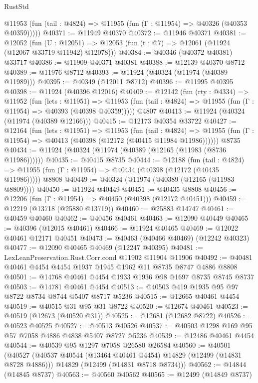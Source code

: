\begin{lexlean}{RustStd}
\begin{coremodule}
{\begin{coremodule}
{{{{{{{{{{{{{{{{{{{{{{{{{{{{{{{{{{{{{{{{{{{{{{{{{{{{{{{{{{{{{{{{{{{{{{{{{{{{{{{{      @11953 (fun (tail : @4824) => @11955 (fun (Γ : @11954) => @40326 (@40353 @40359)))))
@40371 := @11949 @40370
@40372 := @11946 @40371
@40381 := @12052
    (fun (U : @12051) => @12053 (fun (t : @7) => @12061 (@11924 (@12067 @33719 @11942) @12078)))
@40384 := @40346 (@40372 @40381) @33717
@40386 := @11909 @40371 @40381
@40388 := @12139 @40370 @8712
@40389 := @11976 @8712
@40393 := @11924 (@40324 (@11974 (@40389 @11989)))
@40395 := @40349 (@12011 @8712)
@40396 := @11995 @40395
@40398 := @11924 (@40396 @12016)
@40409 := @12142
    (fun (rty : @4334) =>
    @11952
      (fun (lets : @11951) =>
      @11953 (fun (tail : @4824) => @11955 (fun (Γ : @11954) => @40393 (@40398 @40359)))))
    @4807
@40413 := @11924 (@40324 (@11974 (@40389 @12166)))
@40415 := @12173 @40354 @33722
@40427 := @12164
    (fun (lets : @11951) =>
    @11953
      (fun (tail : @4824) =>
      @11955 (fun (Γ : @11954) => @40413 (@40398 (@12172 (@40415 @11984 @11986))))))
    @8735
@40434 := @11924 (@40324 (@11974 (@40389 (@12165 (@11983 (@8736 @11986))))))
@40435 := @40415 @8735
@40444 := @12188
    (fun (tail : @4824) => @11955 (fun (Γ : @11954) => @40434 (@40398 (@12172 (@40435 @11986)))))
    @8808
@40449 := @40324 (@11974 (@40389 (@12165 (@11983 @8809))))
@40450 := @11924 @40449
@40451 := @40435 @8808
@40456 := @12206 (fun (Γ : @11954) => @40450 (@40398 (@12172 @40451)))
@40459 := @12219 (@13718 (@25880 @13719))
@40460 := @25883 @14747
@40461 := @40459 @40460
@40462 := @40456 @40461
@40463 := @12090 @40449
@40465 := @40396 (@12015 @40461)
@40466 := @11924 @40465
@40469 := @12022 @40461 @12171 @40451
@40473 := @40463 (@40466 @40469) (@12242 @40323)
@40477 := @12090 @40465 @40469 (@12247 @40395)
@40481 := LexLeanPreservation.Rust.Corr.cond @11902 @11904 @11906
@40492 := @40481 @40461 @4454 @4454 @1937 @1945 @1962 @11 @8735 @8747 @4886 @8808
@40501 := @14768 @40461 @4454 @1933 @1936 @98 @1697 @8735 @8745 @8737
@40503 := @14781 @40461 @4454
@40513 := @40503 @419 @1935 @95 @97 @8722 @8734 @8744 @5407 @8717 @5236
@40515 := @12665 @40461 @4454
@40519 := @40515 @31 @95 @31 @8722
@40520 := @12674 @40461
@40523 := @40519 (@12673 (@40520 @31))
@40525 := @12681 (@12682 @8722)
@40526 := @40523 @40525
@40527 := @40513 @40526
@40537 := @40503 @1298 @169 @95 @57 @7058 @4886 @4838 @5407 @8727 @5236
@40539 := @12486 @40461 @4454
@40544 := @40539 @95 @1297 @7058 @26580 @26584
@40560 := @40501
    (@40527
      (@40537 @40544 (@13464 @40461 @4454) @14829 (@12499 (@14831 @8728 @4886)))
      @14829
      (@12499 (@14831 @8718 @8734)))
@40562 := @14844 (@14845 @8737)
@40563 := @40560 @40562
@40565 := @12499 (@14849 @8737)
}}}}}}}}}}}}}}}}}}}}}}}}}}}}}}}}}}}}}}}}}}}}}}}}}}}}}}}}}}}}}}}}}}}}}}}}}}}}}}}}
\end{coremodule}}
\end{coremodule}
\end{lexlean}
